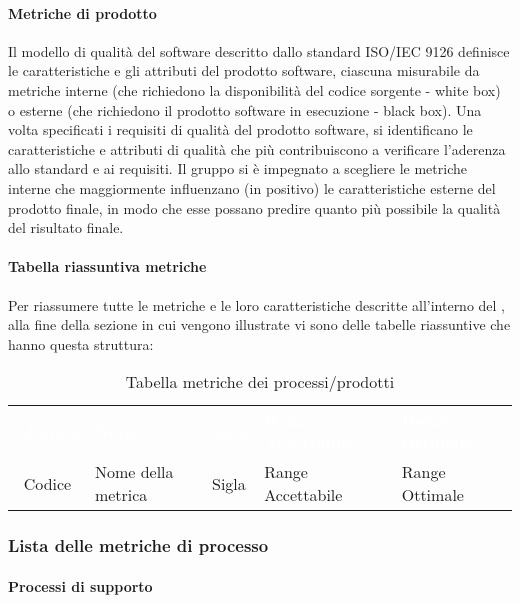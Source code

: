 \paragraph{Metriche di prodotto}
Il modello di qualità del software descritto dallo standard ISO/IEC 9126 definisce le caratteristiche e gli attributi del prodotto software, ciascuna misurabile da metriche interne (che richiedono la disponibilità del codice sorgente - white box) o esterne (che richiedono il prodotto software in esecuzione - black box).
Una volta specificati i requisiti di qualità del prodotto software, si identificano le caratteristiche e attributi di qualità che più contribuiscono a verificare l'aderenza allo standard e ai requisiti.
Il gruppo \Gruppo{} si è impegnato a scegliere le metriche interne che maggiormente influenzano (in positivo) le caratteristiche esterne del prodotto finale, in modo che esse possano predire quanto più possibile la qualità del risultato finale. 

\paragraph{Tabella riassuntiva metriche}
Per riassumere tutte le metriche e le loro caratteristiche descritte all'interno del \PdQ{}, alla fine della sezione in cui vengono illustrate vi sono delle tabelle riassuntive che hanno questa struttura:
{
\renewcommand{\arraystretch}{1.5}
\begin{longtable}{ c C{4cm} c C{3.5cm} C{3.5cm}}
\caption{Tabella metriche dei processi/prodotti}\\
\textcolor{white}{\textbf{Metrica}} & \textcolor{white}{\textbf{Nome}} & \textcolor{white}{\textbf{Sigla}} & \textcolor{white}{\textbf{Range Accettabile}} & \textcolor{white}{\textbf{Range Ottimale}}\\
Codice & Nome della metrica & Sigla & Range Accettabile & Range Ottimale \\
\end{longtable}
}

\subsubsection{Lista delle metriche di processo}
\paragraph{Processi di supporto}

